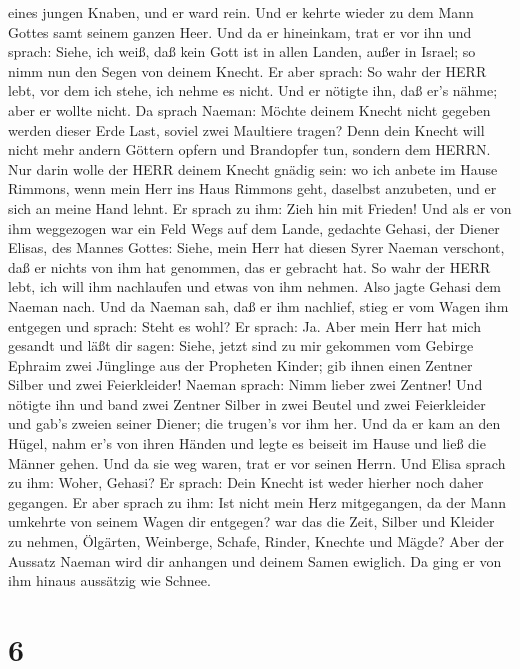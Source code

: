 eines jungen Knaben, und er ward rein.  Und er kehrte
wieder zu dem Mann Gottes samt seinem ganzen Heer. Und da er hineinkam,
trat er vor ihn und sprach: Siehe, ich weiß, daß kein Gott ist in allen
Landen, außer in Israel; so nimm nun den Segen von deinem Knecht.
 Er aber sprach: So wahr der HERR lebt, vor dem ich stehe,
ich nehme es nicht. Und er nötigte ihn, daß er's nähme; aber er wollte
nicht.  Da sprach Naeman: Möchte deinem Knecht nicht
gegeben werden dieser Erde Last, soviel zwei Maultiere tragen? Denn dein
Knecht will nicht mehr andern Göttern opfern und Brandopfer tun, sondern
dem HERRN.  Nur darin wolle der HERR deinem Knecht gnädig
sein: wo ich anbete im Hause Rimmons, wenn mein Herr ins Haus Rimmons
geht, daselbst anzubeten, und er sich an meine Hand lehnt. 
Er sprach zu ihm: Zieh hin mit Frieden! Und als er von ihm weggezogen
war ein Feld Wegs auf dem Lande,  gedachte Gehasi, der
Diener Elisas, des Mannes Gottes: Siehe, mein Herr hat diesen Syrer
Naeman verschont, daß er nichts von ihm hat genommen, das er gebracht
hat. So wahr der HERR lebt, ich will ihm nachlaufen und etwas von ihm
nehmen.  Also jagte Gehasi dem Naeman nach. Und da Naeman
sah, daß er ihm nachlief, stieg er vom Wagen ihm entgegen und sprach:
Steht es wohl?  Er sprach: Ja. Aber mein Herr hat mich
gesandt und läßt dir sagen: Siehe, jetzt sind zu mir gekommen vom
Gebirge Ephraim zwei Jünglinge aus der Propheten Kinder; gib ihnen einen
Zentner Silber und zwei Feierkleider!  Naeman sprach: Nimm
lieber zwei Zentner! Und nötigte ihn und band zwei Zentner Silber in
zwei Beutel und zwei Feierkleider und gab's zweien seiner Diener; die
trugen's vor ihm her.  Und da er kam an den Hügel, nahm
er's von ihren Händen und legte es beiseit im Hause und ließ die Männer
gehen.  Und da sie weg waren, trat er vor seinen Herrn. Und
Elisa sprach zu ihm: Woher, Gehasi? Er sprach: Dein Knecht ist weder
hierher noch daher gegangen.  Er aber sprach zu ihm: Ist
nicht mein Herz mitgegangen, da der Mann umkehrte von seinem Wagen dir
entgegen? war das die Zeit, Silber und Kleider zu nehmen, Ölgärten,
Weinberge, Schafe, Rinder, Knechte und Mägde?  Aber der
Aussatz Naeman wird dir anhangen und deinem Samen ewiglich. Da ging er
von ihm hinaus aussätzig wie Schnee.

\hypertarget{section-5}{%
\section{6}\label{section-5}}

